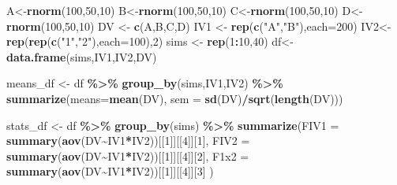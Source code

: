 \documentclass[
]{book}
\newenvironment{Shaded}{\begin{snugshade}}{\end{snugshade}}
\newcommand{\AttributeTok}[1]{\textcolor[rgb]{0.13,0.29,0.53}{#1}}
\newcommand{\DecValTok}[1]{\textcolor[rgb]{0.00,0.00,0.81}{#1}}
\newcommand{\FunctionTok}[1]{\textcolor[rgb]{0.13,0.29,0.53}{\textbf{#1}}}
\newcommand{\NormalTok}[1]{#1}
\newcommand{\OtherTok}[1]{\textcolor[rgb]{0.56,0.35,0.01}{#1}}
\newcommand{\SpecialCharTok}[1]{\textcolor[rgb]{0.81,0.36,0.00}{\textbf{#1}}}
\newcommand{\StringTok}[1]{\textcolor[rgb]{0.31,0.60,0.02}{#1}}
\begin{document}
\begin{Shaded}
\begin{Highlighting}[]
\NormalTok{A}\OtherTok{\textless{}{-}}\FunctionTok{rnorm}\NormalTok{(}\DecValTok{100}\NormalTok{,}\DecValTok{50}\NormalTok{,}\DecValTok{10}\NormalTok{)}
\NormalTok{B}\OtherTok{\textless{}{-}}\FunctionTok{rnorm}\NormalTok{(}\DecValTok{100}\NormalTok{,}\DecValTok{50}\NormalTok{,}\DecValTok{10}\NormalTok{)}
\NormalTok{C}\OtherTok{\textless{}{-}}\FunctionTok{rnorm}\NormalTok{(}\DecValTok{100}\NormalTok{,}\DecValTok{50}\NormalTok{,}\DecValTok{10}\NormalTok{)}
\NormalTok{D}\OtherTok{\textless{}{-}}\FunctionTok{rnorm}\NormalTok{(}\DecValTok{100}\NormalTok{,}\DecValTok{50}\NormalTok{,}\DecValTok{10}\NormalTok{)}
\NormalTok{DV }\OtherTok{\textless{}{-}} \FunctionTok{c}\NormalTok{(A,B,C,D)}
\NormalTok{IV1 }\OtherTok{\textless{}{-}} \FunctionTok{rep}\NormalTok{(}\FunctionTok{c}\NormalTok{(}\StringTok{"A"}\NormalTok{,}\StringTok{"B"}\NormalTok{),}\AttributeTok{each=}\DecValTok{200}\NormalTok{)}
\NormalTok{IV2}\OtherTok{\textless{}{-}}\FunctionTok{rep}\NormalTok{(}\FunctionTok{rep}\NormalTok{(}\FunctionTok{c}\NormalTok{(}\StringTok{"1"}\NormalTok{,}\StringTok{"2"}\NormalTok{),}\AttributeTok{each=}\DecValTok{100}\NormalTok{),}\DecValTok{2}\NormalTok{)}
\NormalTok{sims }\OtherTok{\textless{}{-}} \FunctionTok{rep}\NormalTok{(}\DecValTok{1}\SpecialCharTok{:}\DecValTok{10}\NormalTok{,}\DecValTok{40}\NormalTok{)}
\NormalTok{df}\OtherTok{\textless{}{-}}\FunctionTok{data.frame}\NormalTok{(sims,IV1,IV2,DV)}

\NormalTok{means\_df }\OtherTok{\textless{}{-}}\NormalTok{ df }\SpecialCharTok{\%\textgreater{}\%}
  \FunctionTok{group\_by}\NormalTok{(sims,IV1,IV2) }\SpecialCharTok{\%\textgreater{}\%}
  \FunctionTok{summarize}\NormalTok{(}\AttributeTok{means=}\FunctionTok{mean}\NormalTok{(DV),}
            \AttributeTok{sem =} \FunctionTok{sd}\NormalTok{(DV)}\SpecialCharTok{/}\FunctionTok{sqrt}\NormalTok{(}\FunctionTok{length}\NormalTok{(DV)))}

\NormalTok{stats\_df }\OtherTok{\textless{}{-}}\NormalTok{ df }\SpecialCharTok{\%\textgreater{}\%}
  \FunctionTok{group\_by}\NormalTok{(sims) }\SpecialCharTok{\%\textgreater{}\%}
  \FunctionTok{summarize}\NormalTok{(}\AttributeTok{FIV1 =} \FunctionTok{summary}\NormalTok{(}\FunctionTok{aov}\NormalTok{(DV}\SpecialCharTok{\textasciitilde{}}\NormalTok{IV1}\SpecialCharTok{*}\NormalTok{IV2))[[}\DecValTok{1}\NormalTok{]][[}\DecValTok{4}\NormalTok{]][}\DecValTok{1}\NormalTok{],}
            \AttributeTok{FIV2 =} \FunctionTok{summary}\NormalTok{(}\FunctionTok{aov}\NormalTok{(DV}\SpecialCharTok{\textasciitilde{}}\NormalTok{IV1}\SpecialCharTok{*}\NormalTok{IV2))[[}\DecValTok{1}\NormalTok{]][[}\DecValTok{4}\NormalTok{]][}\DecValTok{2}\NormalTok{],}
            \AttributeTok{F1x2 =} \FunctionTok{summary}\NormalTok{(}\FunctionTok{aov}\NormalTok{(DV}\SpecialCharTok{\textasciitilde{}}\NormalTok{IV1}\SpecialCharTok{*}\NormalTok{IV2))[[}\DecValTok{1}\NormalTok{]][[}\DecValTok{4}\NormalTok{]][}\DecValTok{3}\NormalTok{]}
\NormalTok{            )}


\end{Highlighting}
\end{Shaded}
\end{document}
